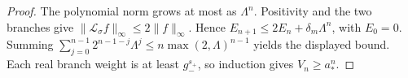 \begin{proof}
The polynomial norm grows at most as $\Lambda^n$.
Positivity and the two branches give
$\|\mathcal L_\sigma f\|_\infty\le2\|f\|_\infty$.
Hence $E_{n+1}\le2E_n+\delta_m\Lambda^n$, with $E_0=0$.
Summing
$\sum_{j=0}^{n-1}2^{n-1-j}\Lambda^j\le n\max(2,\Lambda)^{n-1}$
yields the displayed bound. Each real branch weight is at least
$g_-^{s_+}$, so induction gives $V_n\ge a_*^n$.
\end{proof}
